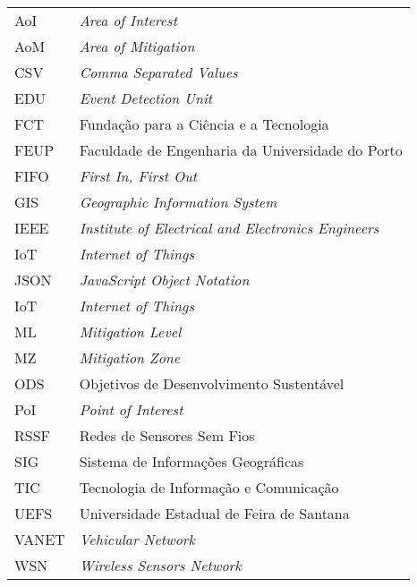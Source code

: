 \begin{thesisabbreviations}
\begin{footnotesize}
\begin{longtable}[l]{p{2cm}l}

    AoI     \dotfill & \textit{Area of Interest} \\
    AoM     \dotfill & \textit{Area of Mitigation} \\
    CSV     \dotfill & \textit{Comma Separated Values} \\
    EDU     \dotfill & \textit{Event Detection Unit} \\
    FCT     \dotfill & Fundação para a Ciência e a Tecnologia \\
    FEUP    \dotfill & Faculdade de Engenharia da Universidade do Porto \\
    FIFO    \dotfill & \textit{First In, First Out} \\
    GIS     \dotfill & \textit{Geographic Information System} \\
    IEEE    \dotfill & \textit{Institute of Electrical and Electronics Engineers} \\
    IoT     \dotfill & \textit{Internet of Things} \\
    JSON    \dotfill & \textit{JavaScript Object Notation} \\
    IoT     \dotfill & \textit{Internet of Things} \\
    ML      \dotfill & \textit{Mitigation Level} \\
    MZ      \dotfill & \textit{Mitigation Zone} \\
    ODS     \dotfill & Objetivos de Desenvolvimento Sustentável \\
    PoI     \dotfill & \textit{Point of Interest} \\
    RSSF    \dotfill & Redes de Sensores Sem Fios \\
    SIG     \dotfill & Sistema de Informações Geográficas \\
    TIC     \dotfill & Tecnologia de Informação e Comunicação \\
    UEFS    \dotfill & Universidade Estadual de Feira de Santana \\
    VANET   \dotfill & \textit{Vehicular Network} \\
    WSN     \dotfill & \textit{Wireless Sensors Network} \\

\end{longtable}
\end{footnotesize}
\end{thesisabbreviations}

